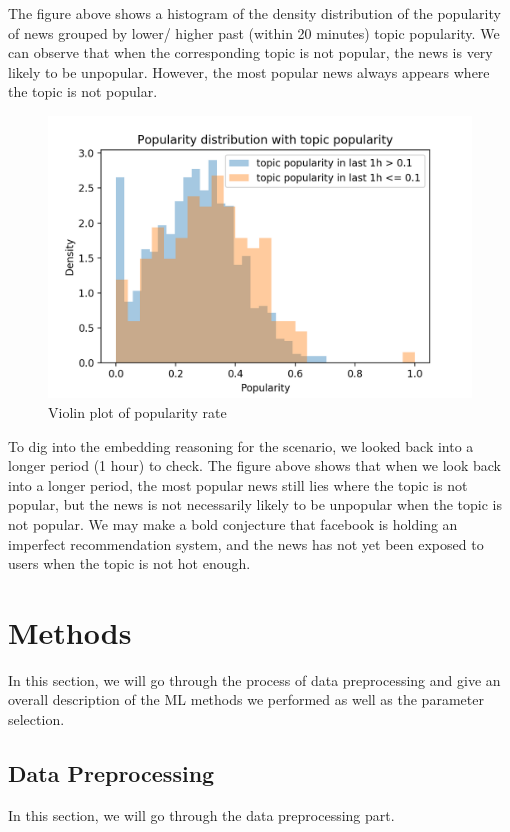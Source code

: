 \documentclass{article}
\begin{document}
The figure above shows a histogram of the density distribution of the popularity of news grouped by lower/ higher past (within 20 minutes) topic popularity. We can observe that when the corresponding topic is not popular, the news is very likely to be unpopular. However, the most popular news always appears where the topic is not popular. 

\begin{figure}[H]
\centering
\includegraphics[scale=0.5]{"Popularity distrib 1h"}
\caption{Violin plot of popularity rate}
\end{figure}

To dig into the embedding reasoning for the scenario, we looked back into a longer period (1 hour) to check. The figure above shows that when we look back into a longer period, the most popular news still lies where the topic is not popular, but the news is not necessarily likely to be unpopular when the topic is not popular. We may make a bold conjecture that facebook is holding an imperfect recommendation system, and the news has not yet been exposed to users when the topic is not hot enough. 

\section{Methods}
In this section, we will go through the process of data preprocessing and give an overall description of the ML methods we performed as well as the parameter selection.
\subsection{Data Preprocessing}
In this section, we will go through the data preprocessing part.
\end{document}
